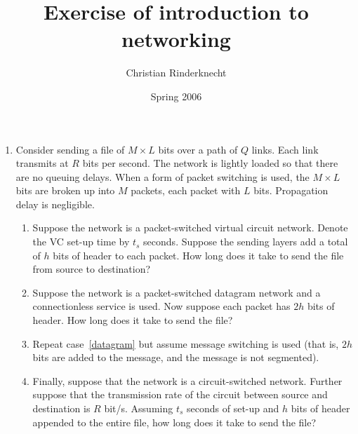 \documentclass[11pt,a4paper]{article}
\title{Exercise of introduction to networking}
\author{Christian Rinderknecht}
\date{Spring 2006}
\begin{document}
\maketitle


\begin{enumerate}

  \item Consider sending a file of \(M \times L\) bits over a path of
    \(Q\) links. Each link transmits at \(R\) bits per second. The
    network is lightly loaded so that there are no queuing
    delays. When a form of packet switching is used, the \(M \times
    L\) bits are broken up into \(M\) packets, each packet with \(L\)
    bits. Propagation delay is negligible.
    \begin{enumerate}

      \item Suppose the network is a packet-switched virtual circuit
        network. Denote the VC set-up time by \(t_s\) seconds. Suppose
        the sending layers add a total of \(h\) bits of header to each
        packet. How long does it take to send the file from source to
        destination?

      \item \label{datagram} Suppose the network is a packet-switched
        datagram network and a connectionless service is used. Now
        suppose each packet has \(2h\) bits of header. How long does
        it take to send the file?

      \item Repeat case~\ref{datagram} but assume message switching is
        used (that is, \(2h\) bits are added to the message, and the
        message is not segmented).

      \item Finally, suppose that the network is a circuit-switched
        network. Further suppose that the transmission rate of the
        circuit between source and destination is \(R\)
        bit/s. Assuming \(t_s\) seconds of set-up and \(h\) bits of
        header appended to the entire file, how long does it take to
        send the file?

    \end{enumerate}


\end{enumerate}
\end{document}
